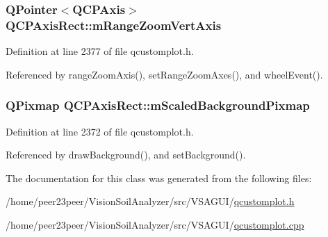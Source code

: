 \subsubsection[{m\+Range\+Zoom\+Vert\+Axis}]{\setlength{\rightskip}{0pt plus 5cm}Q\+Pointer$<${\bf Q\+C\+P\+Axis}$>$ Q\+C\+P\+Axis\+Rect\+::m\+Range\+Zoom\+Vert\+Axis\hspace{0.3cm}{\ttfamily [protected]}}\label{class_q_c_p_axis_rect_a8b9acd16a203a9692bd35a9465f54bc1}


Definition at line 2377 of file qcustomplot.\+h.



Referenced by range\+Zoom\+Axis(), set\+Range\+Zoom\+Axes(), and wheel\+Event().

\hypertarget{class_q_c_p_axis_rect_aa74b9415598d59b49290e41e42d7ee27}{}
\subsubsection[{m\+Scaled\+Background\+Pixmap}]{\setlength{\rightskip}{0pt plus 5cm}Q\+Pixmap Q\+C\+P\+Axis\+Rect\+::m\+Scaled\+Background\+Pixmap\hspace{0.3cm}{\ttfamily [protected]}}\label{class_q_c_p_axis_rect_aa74b9415598d59b49290e41e42d7ee27}


Definition at line 2372 of file qcustomplot.\+h.



Referenced by draw\+Background(), and set\+Background().



The documentation for this class was generated from the following files\+:\begin{DoxyCompactItemize}
\item 
/home/peer23peer/\+Vision\+Soil\+Analyzer/src/\+V\+S\+A\+G\+U\+I/\hyperlink{qcustomplot_8h}{qcustomplot.\+h}\item 
/home/peer23peer/\+Vision\+Soil\+Analyzer/src/\+V\+S\+A\+G\+U\+I/\hyperlink{qcustomplot_8cpp}{qcustomplot.\+cpp}\end{DoxyCompactItemize}
